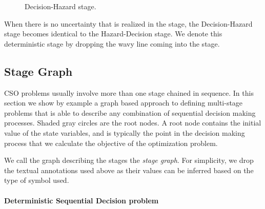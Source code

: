 \documentclass[final,1p,times]{elsarticle}
\begin{document}
\begin{figure}[!ht]
    \centering
{}
\caption{Decision-Hazard stage.}
\label{fig:dh}
\end{figure}

When there is no uncertainty that is realized in the stage, the Decision-Hazard stage becomes identical to the Hazard-Decision stage. We denote this deterministic stage by dropping the wavy line coming into the stage.

\subsection{Stage Graph}

CSO problems usually involve more than one stage chained in sequence. In this section we show by example a graph based approach to defining multi-stage problems that is able to describe any combination of sequential decision making processes. Shaded gray circles are the root nodes. A root node contains the initial value of the state variables, and is typically the point in the decision making process that we calculate the objective of the optimization problem.


We call the graph describing the stages the \emph{stage graph}. For simplicity, we drop the textual annotations used above as their values can be inferred based on the type of symbol used.

\paragraph{Deterministic Sequential Decision problem}
\end{document}
